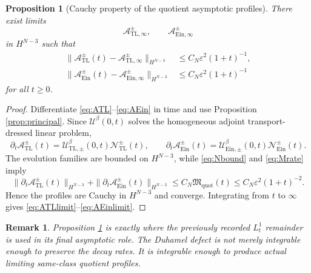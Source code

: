 \documentclass[11pt]{article}
\newtheorem{proposition}{Proposition}
\newtheorem{remark}{Remark}
\begin{document}
\begin{proposition}[Cauchy property of the quotient asymptotic profiles]
\label{prop:cauchy}
There exist limits
\[
\mathcal A_{\mathrm{TL},\infty}^\pm,
\qquad
\mathcal A_{\mathrm{Ein},\infty}^\pm
\]
in \(H^{N-3}\) such that
\begin{align}
\|\mathcal A_{\mathrm{TL}}^\pm(t)-\mathcal A_{\mathrm{TL},\infty}^\pm\|_{H^{N-3}}
&\le
C_N\varepsilon^2(1+t)^{-1},
\label{eq:ATLlimit}
\\
\|\mathcal A_{\mathrm{Ein}}^\pm(t)-\mathcal A_{\mathrm{Ein},\infty}^\pm\|_{H^{N-3}}
&\le
C_N\varepsilon^2(1+t)^{-1}
\label{eq:AEinlimit}
\end{align}
for all \(t\ge 0\).
\end{proposition}

\begin{proof}
Differentiate \eqref{eq:ATL}--\eqref{eq:AEin} in time and use Proposition \ref{prop:principal}. Since \(\mathcal U^\beta(0,t)\) solves the homogeneous adjoint transport-dressed linear problem,
\[
\partial_t\mathcal A_{\mathrm{TL}}^\pm(t)
=
\mathcal U_{\mathrm{TL},\pm}^\beta(0,t)\mathcal N_{\mathrm{TL}}^\pm(t),
\qquad
\partial_t\mathcal A_{\mathrm{Ein}}^\pm(t)
=
\mathcal U_{\mathrm{Ein},\pm}^\beta(0,t)\mathcal N_{\mathrm{Ein}}^\pm(t).
\]
The evolution families are bounded on \(H^{N-3}\), while \eqref{eq:Nbound} and \eqref{eq:Mrate} imply
\[
\|\partial_t\mathcal A_{\mathrm{TL}}^\pm(t)\|_{H^{N-3}}
+\|\partial_t\mathcal A_{\mathrm{Ein}}^\pm(t)\|_{H^{N-3}}
\le
C_N\mathfrak M_{\mathrm{quot}}(t)
\le
C_N\varepsilon^2(1+t)^{-2}.
\]
Hence the profiles are Cauchy in \(H^{N-3}\) and converge. Integrating from \(t\) to \(\infty\) gives \eqref{eq:ATLlimit}--\eqref{eq:AEinlimit}.
\end{proof}

\begin{remark}
Proposition \ref{prop:cauchy} is exactly where the previously recorded \(L_t^1\) remainder is used in its final asymptotic role. The Duhamel defect is not merely integrable enough to preserve the decay rates. It is integrable enough to produce actual limiting same-class quotient profiles.
\end{remark}
\end{document}
